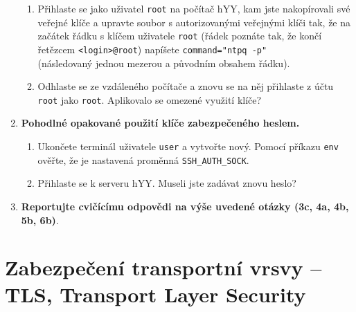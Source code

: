 \documentclass[a4paper,11pt]{article}
\begin{document}
\begin{enumerate}
\begin{enumerate}
      \item Přihlaste se jako uživatel {\tt root} na počítač hYY, kam jste nakopírovali své veřejné klíče a
        upravte soubor s autorizovanými veřejnými klíči tak, že na začátek
        řádku s klíčem uživatele {\tt root} (řádek poznáte tak, že končí řetězcem
        {\tt <login>@root}) napíšete
        \verb|command="ntpq -p" | \\ (následovaný jednou mezerou a původním
        obsahem řádku).

      \item Odhlaste se ze vzdáleného počítače a znovu se na něj přihlaste z
        účtu {\tt root} jako {\tt root}. Aplikovalo se
        omezené využití klíče?

    \end{enumerate}


  \item {\bf Pohodlné opakované použití klíče zabezpečeného heslem.}

    \begin{enumerate}

      \item Ukončete terminál uživatele {\tt user} a vytvořte nový. Pomocí
        příkazu \verb|env| ověřte, že je nastavená proměnná
        \verb|SSH_AUTH_SOCK|.

      \item Přihlaste se k serveru hYY. Museli jste zadávat znovu heslo?

    \end{enumerate}
  \item {\bf Reportujte cvičícímu odpovědi na výše uvedené otázky (3c, 4a, 4b,
    5b, 6b)}.

\end{enumerate}

\section{Zabezpečení transportní vrsvy -- TLS, Transport Layer Security}
\end{document}
